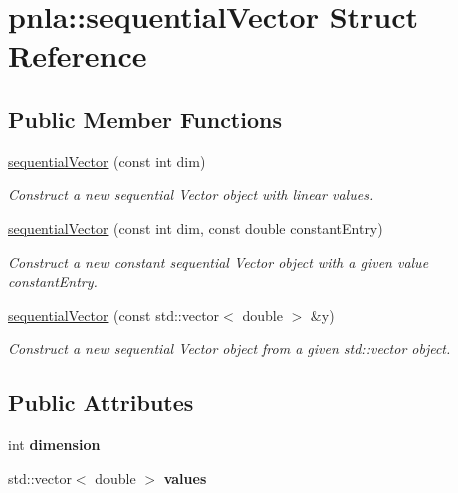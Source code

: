 \hypertarget{structpnla_1_1sequentialVector}{}\section{pnla\+:\+:sequential\+Vector Struct Reference}
\label{structpnla_1_1sequentialVector}
\subsection*{Public Member Functions}
\begin{DoxyCompactItemize}
\item 
\mbox{\hyperlink{structpnla_1_1sequentialVector_a49041d44d294327ecb7083b1e3aa4ef0}{sequential\+Vector}} (const int dim)
\begin{DoxyCompactList}\small\item\em Construct a new sequential Vector object with linear values. \end{DoxyCompactList}\item 
\mbox{\hyperlink{structpnla_1_1sequentialVector_aaced97a869e93a201abe7bb78278f82a}{sequential\+Vector}} (const int dim, const double constant\+Entry)
\begin{DoxyCompactList}\small\item\em Construct a new constant sequential Vector object with a given value constant\+Entry. \end{DoxyCompactList}\item 
\mbox{\hyperlink{structpnla_1_1sequentialVector_a812d6961a41836a9d594dc3045da854d}{sequential\+Vector}} (const std\+::vector$<$ double $>$ \&y)
\begin{DoxyCompactList}\small\item\em Construct a new sequential Vector object from a given std\+::vector object. \end{DoxyCompactList}\end{DoxyCompactItemize}
\subsection*{Public Attributes}
\begin{DoxyCompactItemize}
\item 
\mbox{\label{structpnla_1_1sequentialVector_a6431378a529e51ad955ce1837e431fd9}} 
int {\bfseries dimension}
\item 
\mbox{\label{structpnla_1_1sequentialVector_a359ded029d210c7cddbcb92febf97fc7}} 
std\+::vector$<$ double $>$ {\bfseries values}
\end{DoxyCompactItemize}


